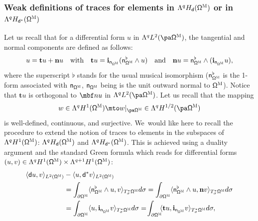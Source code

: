 \subsubsection*{Weak definitions of traces for elements in $\Lambda^q H_{\mathsf d} (\mathsf \Omega^{\textsc{M}})$ or in $\Lambda^q H_{\mathsf d^*} (\mathsf \Omega^{\textsc{M}})$}
Let us recall that for a differential form $u$ in $\Lambda^qL^2 (\pa\mathsf \Omega^{\textsc{M}})$, the tangential and normal components are defined as follows:
\begin{equation}
\label{eq.decomp-bdy}
u= \mathbf t u+\mathbf n u\quad\text{with}\quad
\mathbf t u= \mathbf{i}_{\mathsf n_{\mathsf \Omega^{\textsc{M}}}}(\mathsf n_{\mathsf \Omega^{\textsc{M}}}^{\flat} \wedge u)\quad\text{and}\quad
\mathbf n u= \mathsf n_{\mathsf \Omega^{\textsc{M}}}^{\flat}\wedge(\mathbf{i}_{\mathsf n_{\mathsf \Omega^{\textsc{M}}}} u),
\end{equation}
where the superscript $\flat$ stands for the usual musical
isomorphism ($\mathsf n_{\mathsf \Omega^{\textsc{M}}}^\flat$ is the 1-form associated with $\mathsf n_{\mathsf \Omega^{\textsc{M}}}$, $\mathsf n_{\mathsf \Omega^{\textsc{M}}}$ being is the unit outward normal to $\mathsf \Omega^{\textsc{M}}$). Notice that $\mathbf t u$ is orthogonal to $\mbf n u$ in $\Lambda^qL^2 (\pa\mathsf \Omega^{\textsc{M}})$. Let us
recall that the mapping
\begin{equation}
\label{eq.trace-usual}
w\in \Lambda^qH^1(\mathsf \Omega^{\textsc{M}})\mto w|_{\pa \mathsf \Omega^{\textsc{M}}}\in \Lambda^qH^{1/2} (\pa\mathsf \Omega^{\textsc{M}})
\end{equation}
is well-defined, continuous, and surjective. We~would like here to
recall the procedure to extend the notion of traces to elements in
the subspaces of $\Lambda^qH^1(\mathsf \Omega^{\textsc{M}})$: $\Lambda^q H_{\mathsf d} (\mathsf \Omega^{\textsc{M}})$ and $\Lambda^q H_{\mathsf d^*} (\mathsf \Omega^{\textsc{M}})$. This is achieved using a duality argument and the standard Green formula which reads for differential forms $(u,v)\in \Lambda^{q}H^1 (\mathsf \Omega^{\textsc{M}}) \times \Lambda^{q
+1}H^1 (\mathsf \Omega^{\textsc{M}})$:
\begin{align}
\label{eq:usual_Green}
\langle \mathsf du, v\rangle_{ L^2 (\mathsf \Omega^{\textsc{M}})}&-
\langle u, \mathsf d^*v\rangle_{ L^2 (\mathsf \Omega^{\textsc{M}})}\\
\nonumber&= \int_{\partial \mathsf \Omega^{\textsc{M}}} \langle \mathsf n_{\mathsf \Omega^{\textsc{M}}}^\flat \wedge u,v\rangle_{ T^*_{\sigma}\mathsf \Omega^{\textsc{M}}} d\sigma= \int_{\partial \mathsf \Omega^{\textsc{M}}} \langle \mathsf n_{\mathsf \Omega^{\textsc{M}}}^\flat \wedge u, \mathbf n v\rangle_{ T^*_{\sigma}\mathsf \Omega^{\textsc{M}}} d\sigma\\
&=\int_{\partial \mathsf \Omega^{\textsc{M}}} \langle u,\mathbf{i}_{\mathsf n_{\mathsf \Omega^{\textsc{M}}}} v\rangle_{ T^*_{\sigma}\mathsf \Omega^{\textsc{M}}} d\sigma=\! \int_{\partial \mathsf \Omega^{\textsc{M}}} \!\! \langle \mathbf t u,\mathbf{i}_{\mathsf n_{\mathsf \Omega^{\textsc{M}}}} v\rangle_{ T^*_{\sigma}\mathsf \Omega^{\textsc{M}}} d\sigma,\notag
\end{align}
